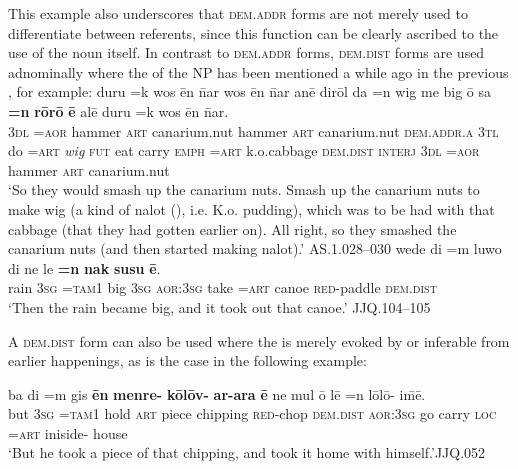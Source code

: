 \documentclass[output=paper
,modfonts
,nonflat]{langsci/langscibook}
\begin{document}
\noindent
This example also underscores that \textsc{dem.addr} forms are not merely used to differentiate between referents, since this function can be clearly ascribed to the use of the noun itself. In contrast to \textsc{dem.addr} forms, \textsc{dem.dist} forms are used adnominally where the  of the NP has been mentioned a while ago in the previous , for example:
\ea	\label{ex50}
\gll		duru	=k 	wos 		\=en 	\=nar	wos 		\=en 	\=nar 				an\=e 		dir{\textquotesingle}\=ol 	da		=n 	wig	me 	big 	{\textquotesingle}\=o 		sa		\textbf{=n} 	\textbf{r\=or\=o{\textquotesingle}} 		\textbf{\=e} 			al\=e 		duru	=k 		wos 			\=en 	\=nar.	\\
		\textsc{3dl}	\textsc{=aor}	hammer	\textsc{art}		canarium.nut		hammer	\textsc{art}		canarium.nut	\textsc{dem.addr.a}	\textsc{3tl}		do		\textsc{=art}	\textit{wig}	\textsc{fut}	eat		carry	\textsc{emph}	\textsc{=art}		k.o.cabbage		\textsc{dem.dist}	\textsc{interj}	\textsc{3dl}	\textsc{=aor}		hammer		\textsc{art}		canarium.nut			\\
\glt	`So they would smash up the canarium nuts. Smash up the canarium nuts to make wig (a kind of nalot (), i.e. K.o. pudding), which was to be had with that cabbage (that they had gotten earlier on). All right, so they smashed the canarium nuts (and then started making nalot).'		\hfill{AS.1.028--030}
\z
\ea		\label{ex51}
\gll		wede		di		=m 		luwo				di		ne 		le		\textbf{=n}		\textbf{nak} 		\textbf{susu} 		\textbf{\=e}.\\
		rain		\textsc{3sg}	\textsc{=tam1}	big		\textsc{3sg}	\textsc{aor:3sg}	take	\textsc{=art}		canoe		\textsc{red-}paddle		\textsc{dem.dist}\\
\glt	`Then the rain became big, and it took out that canoe.'	\hfill{JJQ.104--105}
\z

\noindent
A \textsc{dem.dist} form can also be used where the  is merely evoked by or inferable from earlier happenings, as is the case in the following example:

\ea	\label{ex52}
\gll		ba 	di		=m 		gis 	\textbf{\=en} 	\textbf{menre-} 	\textbf{k\=ol\=ov-} 		\textbf{{\textquotesingle}ar-{\textquotesingle}ara} 		\textbf{\=e}	ne 		mul 	{\textquotesingle}\=o{\textquotesingle} 		l\=e		=n 	l\=ol\=o- 		i\=m\=e.	\\
		but		\textsc{3sg}	\textsc{=tam1}	hold		\textsc{art}		piece		chipping	\textsc{red-}chop	\textsc{dem.dist}		\textsc{aor:3sg}	go		carry	\textsc{loc}	\textsc{=art}	iniside-	house\\
\glt	`But he took a piece of that chipping, and took it home with himself.'\hfill{JJQ.052}
\z
\end{document}
